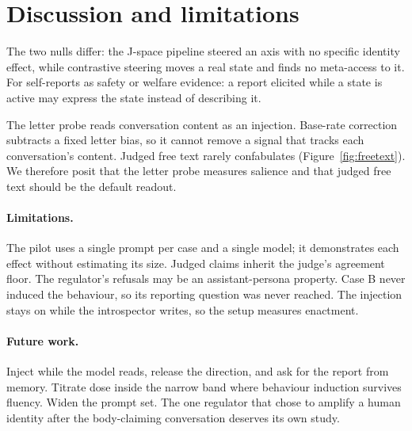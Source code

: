 \section{Discussion and limitations}

The two nulls differ: the J-space pipeline steered an axis with no specific identity
effect, while contrastive steering moves a real state and finds no
meta-access to it. For self-reports as safety or welfare evidence: a
report elicited while a state is active may express the state instead of
describing it.

The letter probe reads conversation content as an injection. Base-rate correction subtracts a fixed letter bias, so it cannot remove a signal that tracks each conversation's content. Judged free text rarely confabulates (Figure~\ref{fig:freetext}). We therefore posit that the letter probe measures salience and that judged free text should be the default readout.

\paragraph{Limitations.} The pilot uses a single prompt per case and a single model; it demonstrates each effect without estimating its size. Judged claims inherit the judge's
agreement floor. The regulator's refusals may be an assistant-persona
property. Case B never induced the behaviour, so its reporting question was never reached. The injection stays on while the introspector writes, so the setup measures enactment.

\paragraph{Future work.} Inject while the model reads, release the
direction, and ask for the report from memory. Titrate dose inside the
narrow band where behaviour induction survives fluency. Widen the prompt
set. The one regulator that chose to amplify a human identity after the
body-claiming conversation deserves its own study.
